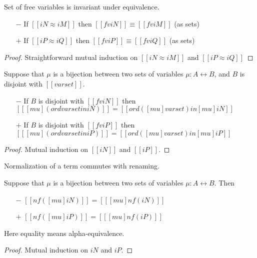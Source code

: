 \begin{lemma}
  \label{lemma:equiv-fv}
  Set of free variables is invariant under equivalence.
  \begin{itemize}
  \item[$-$] If $[[iN ≈ iM]]$ then $[[fv iN]] \equiv [[fv iM]]$ (as sets)
  \item[$+$] If $[[iP ≈ iQ]]$ then $[[fv iP]] \equiv [[fv iQ]]$ (as sets)
  \end{itemize}
\end{lemma}
\begin{proof}
  Straightforward mutual induction on $[[iN ≈ iM]]$ and $[[iP ≈ iQ]]$
\end{proof}


\begin{lemma}
  \label{lemma:distr-mu-ord}
  Suppose that $\mu$ is a bijection between two sets of variables
  $\mu : A \leftrightarrow B$, and $B$ is disjoint with $[[varset]]$.
  \begin{itemize}
  \item[$-$]
    If $B$ is disjoint with $[[fv iN]]$ then
    $[[ [mu] (ord varset in iN) ]] = [[ord ([mu] varset) in [mu] iN ]]$
  \item[$+$]
    If $B$ is disjoint with $[[fv iP]]$ then
    $[[ [mu] (ord varset in iP) ]] = [[ord ([mu] varset) in [mu] iP ]]$
  \end{itemize}
\end{lemma}
\begin{proof}
  Mutual induction on $[[iN]]$ and $[[iP]]$.
\end{proof}


\begin{lemma}
  \label{lemma:norm-subst-commute} Normalization of a term commutes with renaming.

  Suppose that $\mu$ is a bijection between two sets of variables
  $\mu : A \leftrightarrow B$. Then
  \begin{itemize}
    \item[$-$] $[[nf([mu]iN)]] = [[ [mu] nf(iN) ]]$
    \item[$+$] $[[nf([mu]iP)]] = [[ [mu] nf(iP) ]]$
  \end{itemize}
  Here equality means alpha-equivalence.
\end{lemma}

\begin{proof}
  Mutual induction on $iN$ and $iP$.
\end{proof}